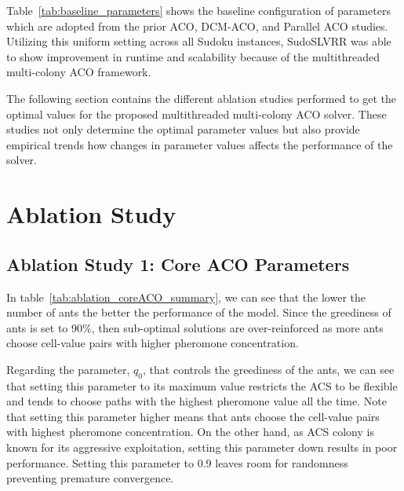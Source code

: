 Table~\ref{tab:baseline_parameters} shows the baseline configuration of parameters which are adopted from the prior ACO, DCM-ACO, and Parallel ACO studies. Utilizing this uniform setting across all Sudoku instances, SudoSLVRR was able to show improvement in runtime and scalability because of the multithreaded multi-colony ACO framework. 

The following section contains the different ablation studies performed to get the optimal values for the proposed multithreaded multi-colony ACO solver. These studies not only determine the optimal parameter values but also provide empirical trends how changes in parameter values affects the performance of the solver.

\section{Ablation Study}
\subsection{Ablation Study 1: Core ACO Parameters}
    In table~\ref{tab:ablation_coreACO_summary}, we can see that the lower the number of ants the better the performance of the model. Since the greediness of ants is set to 90\%, then sub-optimal solutions are over-reinforced as more ants choose cell-value pairs with higher pheromone concentration. 
    
    Regarding the parameter, $q_{0}$, that controls the greediness of the ants, we can see that setting this parameter to its maximum value restricts the ACS to be flexible and tends to choose paths with the highest pheromone value all the time. Note that setting this parameter higher means that ants choose the cell-value pairs  with highest pheromone concentration. On the other hand, as ACS colony is known for its aggressive exploitation, setting this parameter down results in poor performance. Setting this parameter to $0.9$ leaves room for randomness preventing premature convergence. 

